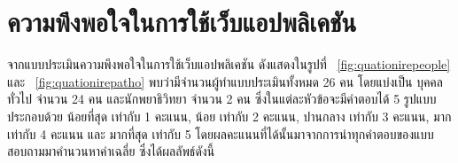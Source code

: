 \documentclass[12pt,oneside,openright,a4paper]{cpe-thai-project}
\begin{document}

\section{ความพึงพอใจในการใช้เว็บแอปพลิเคชัน}
จากแบบประเมินความพึงพอใจในการใช้เว็บแอปพลิเคชัน ดังแสดงในรูปที่ ~\ref{fig:quationirepeople} และ ~\ref{fig:quationirepatho} พบว่ามีจำนวนผู้ทำแบบประเมินทั้งหมด 26 คน โดยแบ่งเป็น บุคคลทั่วไป จำนวน 24 คน และนักพยาธิวิทยา จำนวน 2 คน ซึ่งในแต่ละหัวข้อจะมีคําตอบได้ 5 รูปแบบ ประกอบด้วย น้อยที่สุด เท่ากับ 1 คะแนน,
น้อย เท่ากับ 2 คะแนน, ปานกลาง เท่ากับ 3 คะแนน, มาก เท่ากับ 4 คะแนน และ มากที่สุด เท่ากับ 5 โดยผลคะแนนที่ได้นั้นมาจากการนําทุกคําตอบของแบบสอบถามมาคํานวนหาค่าเฉลี่ย ซึ่งได้ผลลัพธ์ดังนี้
\end{document}
